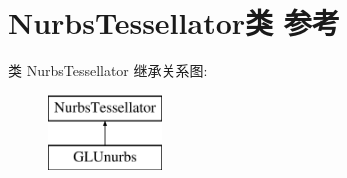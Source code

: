 \hypertarget{class_nurbs_tessellator}{}\section{Nurbs\+Tessellator类 参考}
\label{class_nurbs_tessellator}
类 Nurbs\+Tessellator 继承关系图\+:\begin{figure}[H]
\begin{center}
\leavevmode
\includegraphics[height=2.000000cm]{class_nurbs_tessellator}
\end{center}
\end{figure}
